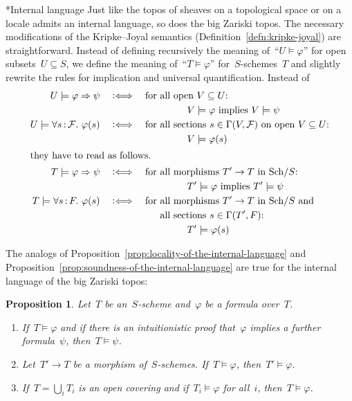\documentclass[10pt,reqno,a4paper]{amsbook}
\makeatletter
\theoremstyle{definition}
\theoremstyle{plain}
\newtheorem{prop}[defn]{Proposition}
\theoremstyle{remark}
\newcommand{\F}{\mathcal{F}}
\newcommand{\Sch}{\mathrm{Sch}}
\newcommand{\?}{\,{:}\,}
\renewcommand{\_}{\mathpunct{.}\,}
\newcommand{\Ll}{\vcentcolon\Longleftrightarrow}
\newcommand{\nocontentsline}[3]{}
\newcommand{\tocless}[1]{\let\addcontentsline=\nocontentsline}
\def\subsection{\@startsection{subsection}{2}%
  {0pt}{.5\linespacing\@plus.7\linespacing}{-.5em}%
  {\normalfont\bfseries}}
\makeatother
\begin{document}
{\tocless

\subsection*{Internal language} Just like the topos of sheaves on a topological
space or on a locale admits an internal language, so does the big Zariski topos.
The necessary modifications of the Kripke--Joyal semantics
(Definition~\ref{defn:kripke-joyal}) are straightforward. Instead of
defining recursively the meaning of~``$U \models \varphi$'' for open subsets~$U
\subseteq S$, we define the meaning of~``$T \models \varphi$''
for~$S$-schemes~$T$ and slightly rewrite the rules for implication and universal quantification.
Instead of
\begin{align*}
  U \models \varphi \Rightarrow \psi \quad&\Ll\quad
  \text{for all open~$V \subseteq U$:} \\
  &\qquad\qquad\qquad\qquad\text{$V \models \varphi$ implies $V \models \psi$} \\
  U \models \forall s\?\F\_ \varphi(s) \quad&\Ll\quad
  \text{for all sections~$s \in \Gamma(V, \F)$ on open $V \subseteq U$:} \\
  &\qquad\qquad\qquad\qquad V \models \varphi(s) \\
\intertext{they have to read as follows.}
  T \models \varphi \Rightarrow \psi \quad&\Ll\quad
  \text{for all morphisms~$T' \to T$ in~$\Sch/S$:} \\
  &\qquad\qquad\qquad\qquad\text{$T' \models \varphi$ implies $T' \models \psi$} \\
  T \models \forall s\?F\_ \varphi(s) \quad&\Ll\quad
  \text{for all morphisms~$T' \to T$ in~$\Sch/S$ and} \\
  &\phantom{{}\Ll\quad\text{for }} \text{all sections~$s \in \Gamma(T', F)$:} \\
  &\qquad\qquad\qquad\qquad T' \models \varphi(s)
\end{align*}

The analogs of Proposition~\ref{prop:locality-of-the-internal-language} and
Proposition~\ref{prop:soundness-of-the-internal-language} are true for the internal
language of the big Zariski topos:

\begin{prop}\label{prop:basic-properties-language-big}
Let~$T$ be an~$S$-scheme and~$\varphi$ be a formula over~$T$.
\begin{enumerate}
\item If~$T \models \varphi$ and if there is an intuitionistic proof
that~$\varphi$ implies a further formula~$\psi$, then~$T \models \psi$.
\item Let~$T' \to T$ be a morphism of~$S$-schemes. If~$T \models \varphi$,
then~$T' \models \varphi$.
\item If~$T = \bigcup_i T_i$ is an open covering and if~$T_i \models \varphi$
for all~$i$, then~$T \models \varphi$.
\end{enumerate}
\end{prop}

}
\end{document}

